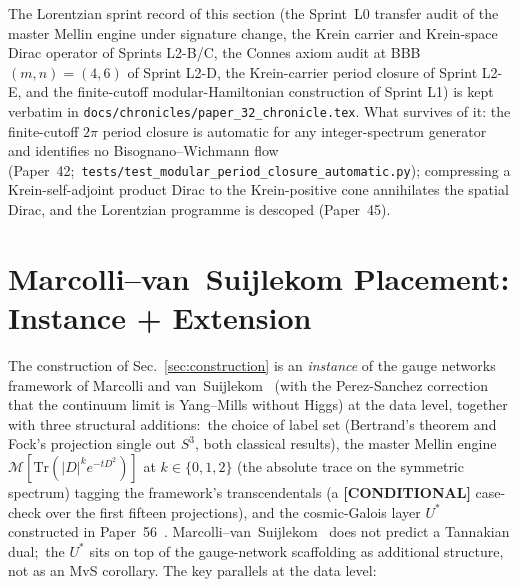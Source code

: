 \documentclass[11pt]{article}
\begin{document}
The Lorentzian sprint record of this section (the Sprint~L0 transfer
audit of the master Mellin engine under signature change, the Krein
carrier and Krein-space Dirac operator of Sprints L2-B/C, the Connes
axiom audit at BBB $(m, n) = (4, 6)$ of Sprint L2-D, the Krein-carrier
period closure of Sprint L2-E, and the finite-cutoff modular-Hamiltonian
construction of Sprint L1) is kept verbatim in
\texttt{docs/chronicles/paper\_32\_chronicle.tex}.  What survives of it:
the finite-cutoff $2\pi$ period closure is automatic for any
integer-spectrum generator and identifies no Bisognano--Wichmann flow
(Paper~42;\ \texttt{tests/test\_modular\_period\_closure\_automatic.py});
compressing a Krein-self-adjoint product Dirac to the Krein-positive cone
annihilates the spatial Dirac, and the Lorentzian programme is descoped
(Paper~45).

\section{Marcolli--van~Suijlekom Placement: Instance + Extension}
\label{sec:lineage}

The construction of Sec.~\ref{sec:construction} is an \emph{instance}
of the gauge networks framework of Marcolli and
van~Suijlekom~\cite{marcolli_vs2014} (with the Perez-Sanchez
correction~\cite{perez_sanchez2025} that the continuum limit is
Yang--Mills without Higgs) at the data level, together with three
structural additions:\ the choice of label set (Bertrand's theorem and
Fock's projection single out $S^3$, both classical results), the
master Mellin engine $\mathcal{M}[\mathrm{Tr}(|D|^k e^{-tD^2})]$ at
$k \in \{0,1,2\}$ (the absolute trace on the symmetric spectrum) tagging the framework's transcendentals (a
\textbf{[CONDITIONAL]} case-check over the first fifteen projections), and
the cosmic-Galois layer $U^*$ constructed in Paper~56~\cite{loutey_paper56}.  Marcolli--van~Suijlekom~\cite{marcolli_vs2014}
does not predict a Tannakian dual;\ the $U^*$ sits on top of the
gauge-network scaffolding as additional structure, not as an MvS
corollary.  The key parallels at the data level:
\end{document}
